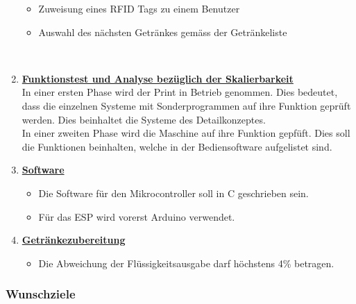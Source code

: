 \begin{enumerate}
\begin{itemize}
\item Zuweisung eines RFID Tags zu einem Benutzer
\item Auswahl des nächsten Getränkes gemäss der Getränkeliste
\end{itemize}\mbox{}\\

\item \underline{\textbf{Funktionstest und Analyse bezüglich der Skalierbarkeit}}\mbox{}\\
			
In einer ersten Phase wird der Print in Betrieb genommen. Dies bedeutet, dass die einzelnen Systeme mit Sonderprogrammen auf ihre Funktion geprüft werden. Dies beinhaltet die Systeme des Detailkonzeptes.\\

In einer zweiten Phase wird die Maschine auf ihre Funktion gepfüft. Dies soll die Funktionen beinhalten, welche in der Bediensoftware aufgelistet sind.\\
			
			 
\item \underline{\textbf{Software}}\mbox{}\\
\begin{itemize}
\item Die Software für den Mikrocontroller soll in C geschrieben sein. 
			
\item Für das ESP wird vorerst Arduino verwendet.\\
\end{itemize}

\item \underline{\textbf{Getränkezubereitung}}\mbox{}\\
\begin{itemize}
\item Die Abweichung der Flüssigkeitsausgabe darf höchstens 4\% betragen. \\
\end{itemize}
			
\end{enumerate}	
\newpage
\subsubsection{Wunschziele}\label{sec:Wunschziele}

